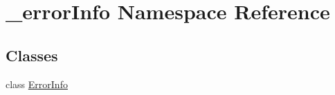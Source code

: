 \hypertarget{namespace__error_info}{}\section{\+\_\+error\+Info Namespace Reference}
\label{namespace__error_info}
\subsection*{Classes}
\begin{DoxyCompactItemize}
\item 
class \hyperlink{class__error_info_1_1_error_info}{Error\+Info}
\end{DoxyCompactItemize}
